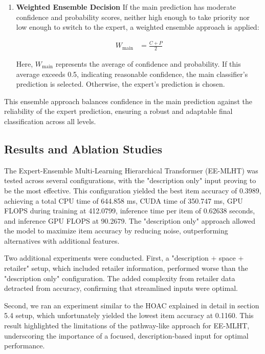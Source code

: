 \documentclass[9pt,a4paper,twoside]{rho-class/rho}
\begin{document}
\begin{enumerate}
        \item \textbf{Weighted Ensemble Decision}
        If the main prediction has moderate confidence and probability scores, neither high enough to take priority nor low enough to switch to the expert, a weighted ensemble approach is applied:
        
        \begin{align*}
            W_{\text{main}} &= \frac{C + P}{2}
        \end{align*}
        
        Here, $W_{\text{main}}$ represents the average of confidence and probability. If this average exceeds 0.5, indicating reasonable confidence, the main classifier’s prediction is selected. Otherwise, the expert’s prediction is chosen.

    \end{enumerate}

This ensemble approach balances confidence in the main prediction against the reliability of the expert prediction, ensuring a robust and adaptable final classification across all levels.

 
 \subsection{Results and Ablation Studies}
    
    The Expert-Ensemble Multi-Learning Hierarchical Transformer (EE-MLHT) was tested across several configurations, with the "description only" input proving to be the most effective. This configuration yielded the best item accuracy of 0.3989, achieving a total CPU time of 644.858 ms, CUDA time of 350.747 ms, GPU FLOPS during training at 412.0799, inference time per item of 0.62638 seconds, and inference GPU FLOPS at 90.2679. The "description only" approach allowed the model to maximize item accuracy by reducing noise, outperforming alternatives with additional features.
    
    Two additional experiments were conducted. First, a "description + space + retailer" setup, which included retailer information, performed worse than the "description only" configuration. The added complexity from retailer data detracted from accuracy, confirming that streamlined inputs were optimal.
    
    Second, we ran an experiment similar to the HOAC explained in detail in section 5.4 setup, which unfortunately yielded the lowest item accuracy at 0.1160. This result highlighted the limitations of the pathway-like approach for EE-MLHT, underscoring the importance of a focused, description-based input for optimal performance.
    
\end{document}
